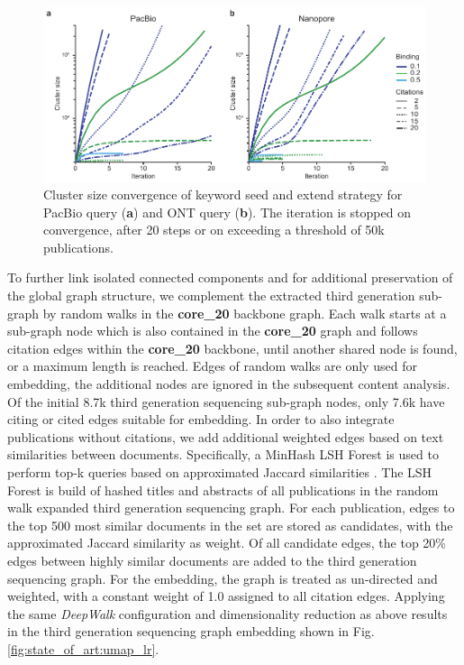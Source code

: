 \begin{figure}[h]
	\centering
	\includegraphics[width=1.0\textwidth]{figures/state_of_art/cluster_convergence.pdf}
	\captionsetup{format=plain}
	\caption[Keyword Seed and Extend Convergence]{Cluster size convergence of keyword seed and extend strategy for PacBio query (\textbf{a}) and ONT query (\textbf{b}). The iteration is stopped on convergence, after 20 steps or on exceeding a threshold of 50k publications.}
	\label{fig:state_of_art:cluster_convergence}
\end{figure}

To further link isolated connected components and for additional preservation of the global graph structure, we complement the extracted third generation sub-graph by random walks in the \textbf{core\_20} backbone graph.
Each walk starts at a sub-graph node which is also contained in the \textbf{core\_20} graph and follows citation edges within the \textbf{core\_20} backbone, until another shared node is found, or a maximum length is reached.
Edges of random walks are only used for embedding, the additional nodes are ignored in the subsequent content analysis.
Of the initial 8.7k third generation sequencing sub-graph nodes, only 7.6k have citing or cited edges suitable for embedding.
In order to also integrate publications without citations, we add additional weighted edges based on text similarities between documents.
Specifically, a MinHash LSH Forest is used to perform top-k queries based on approximated Jaccard similarities \cite{Bawa2005}.
The LSH Forest is build of hashed titles and abstracts of all publications in the random walk expanded third generation sequencing graph.
For each publication, edges to the top 500 most similar documents in the set are stored as candidates, with the approximated Jaccard similarity as weight.
Of all candidate edges, the top 20\% edges between highly similar documents are added to the third generation sequencing graph.
For the embedding, the graph is treated as un-directed and weighted, with a constant weight of 1.0 assigned to all citation edges.
Applying the same \textit{DeepWalk} configuration and dimensionality reduction as above results in the third generation sequencing graph embedding shown in Fig. \ref{fig:state_of_art:umap_lr}.

